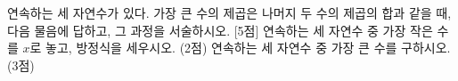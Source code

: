 연속하는 세 자연수가 있다. 가장 큰 수의 제곱은 나머지 두 수의 제곱의 합과 같을 때, 다음 물음에 답하고, 그 과정을 서술하시오. \mbox{[5점]}
 연속하는 세 자연수 중 가장 작은 수를 $x$로 놓고, 방정식을 세우시오. (2점)
 연속하는 세 자연수 중 가장 큰 수를 구하시오. (3점)
